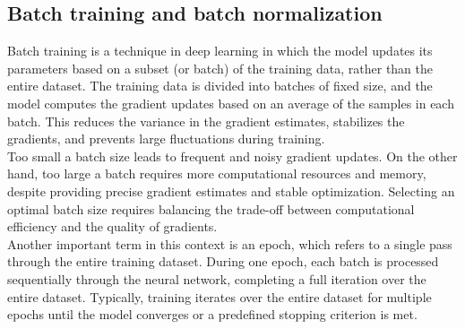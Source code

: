 \subsection{Batch training and batch normalization}
Batch training is a technique in deep learning in which the model updates its parameters based on a subset (or batch) of the training data, rather than the entire dataset. The training data is divided into batches of fixed size, and the model computes the gradient updates based on an average of the samples in each batch. This reduces the variance in the gradient estimates, stabilizes the gradients, and prevents large fluctuations during training. \\
Too small a batch size leads to frequent and noisy gradient updates. On the other hand, too large a batch requires more computational resources and memory, despite providing precise gradient estimates and stable optimization. Selecting an optimal batch size requires balancing the trade-off between computational efficiency and the quality of gradients. \\                     
Another important term in this context is an epoch, which refers to a single pass through the entire training dataset. During one epoch, each batch is processed sequentially through the neural network, completing a full iteration over the entire dataset. Typically, training iterates over the entire dataset for multiple epochs until the model converges or a predefined stopping criterion is met. \\


